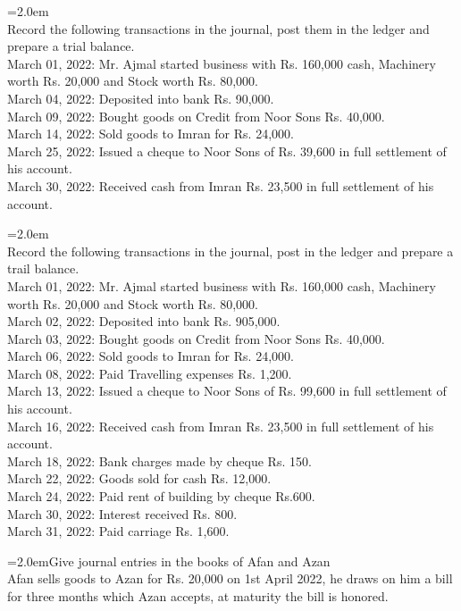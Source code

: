\documentclass[11pt,a4paper]{article}
\newcommand{\lqn}[2]{\Needspace{6\baselineskip}\par\medskip\noindent\hangindent=2.0em\hangafter=1\makebox[2.0em][l]{\textbf{#1.}}#2\par}
\begin{document}
\lqn{26}{\\
Record the following transactions in the journal, post them in the ledger and prepare a trial balance.\\
March 01, 2022: Mr. Ajmal started business with Rs. 160,000 cash, Machinery worth Rs. 20,000 and Stock worth Rs. 80,000.\\
March 04, 2022: Deposited into bank Rs. 90,000.\\
March 09, 2022: Bought goods on Credit from Noor Sons Rs. 40,000.\\
March 14, 2022: Sold goods to Imran for Rs. 24,000.\\
March 25, 2022: Issued a cheque to Noor Sons of Rs. 39,600 in full settlement of his account.\\
March 30, 2022: Received cash from Imran Rs. 23,500 in full settlement of his account.\par
}
\lqn{27}{\\
Record the following transactions in the journal, post in the ledger and prepare a trail balance.\\
March 01, 2022: Mr. Ajmal started business with Rs. 160,000 cash, Machinery worth Rs. 20,000 and Stock worth Rs. 80,000.\\
March 02, 2022: Deposited into bank Rs. 905,000.\\
March 03, 2022: Bought goods on Credit from Noor Sons Rs. 40,000.\\
March 06, 2022: Sold goods to Imran for Rs. 24,000.\\
March 08, 2022: Paid Travelling expenses Rs. 1,200.\\
March 13, 2022: Issued a cheque to Noor Sons of Rs. 99,600 in full settlement of his account.\\
March 16, 2022: Received cash from Imran Rs. 23,500 in full settlement of his account.\\
March 18, 2022: Bank charges made by cheque Rs. 150.\\
March 22, 2022: Goods sold for cash Rs. 12,000.\\
March 24, 2022: Paid rent of building by cheque Rs.600.\\
March 30, 2022: Interest received Rs. 800.\\
March 31, 2022: Paid carriage Rs. 1,600.\par
}
\lqn{28}{Give journal entries in the books of Afan and Azan\\
Afan sells goods to Azan for Rs. 20,000 on 1st April 2022, he draws on him a bill for three months which Azan accepts, at maturity the bill is honored.\par
}
\end{document}
